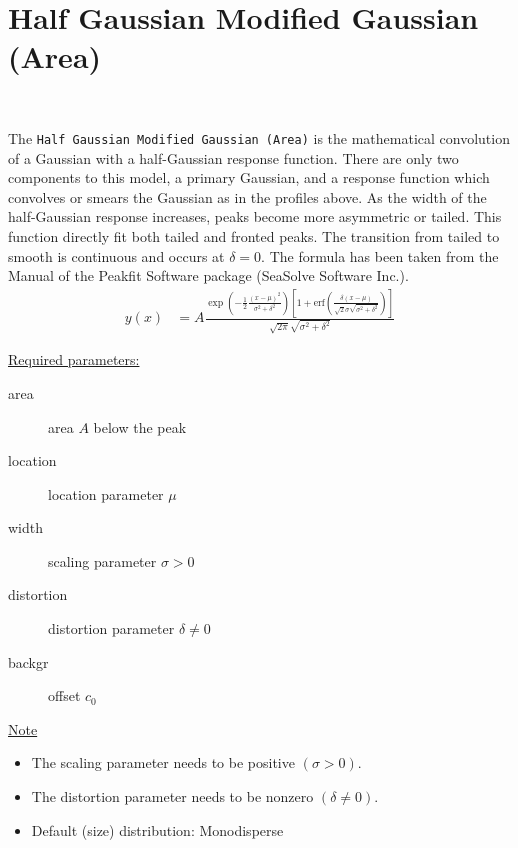\clearpage
\section{Half Gaussian Modified Gaussian (Area)} ~\\
\label{sec:HalfGaussianModifiedGaussianArea}

The \texttt{Half Gaussian Modified Gaussian (Area)} is the mathematical
convolution of a Gaussian with a half-Gaussian response function. There are only two
components to this model, a primary Gaussian, and a response function
which convolves or smears the Gaussian as in the profiles above. As the
width of the half-Gaussian response increases, peaks become more
asymmetric or tailed. This function directly fit both tailed and fronted peaks. The transition from
tailed to smooth is continuous and occurs at $\delta=0$. The formula has been taken from the
Manual of the Peakfit Software package (SeaSolve Software Inc.).
\begin{align}
y(x) &= A \frac{
            \exp\left(-\frac{1}{2} \frac{\left(x-\mu\right)^2}{\sigma^2+\delta^2}\right)
            \left[1+\mathrm{erf}\left(\frac{\delta \left(x-\mu\right)}{\sqrt{2}\sigma\sqrt{\sigma^2+\delta^2}}\right)\right]
        }{
            \sqrt{2\pi}\sqrt{\sigma^2+\delta^2}}
\end{align}

\uline{Required parameters:}
\begin{description}
    \item[area] area $A$ below the peak
    \item[location] location parameter $\mu$
    \item[width] scaling parameter $\sigma > 0$
    \item[distortion] distortion parameter $\delta \neq 0$
    \item[backgr] offset $c_0$
\end{description}

\uline{Note}
\begin{itemize}
  \item The scaling parameter needs to be positive $(\sigma > 0)$.
  \item The distortion parameter needs to be nonzero $(\delta \neq 0)$.
  \item Default (size) distribution: Monodisperse
\end{itemize}


